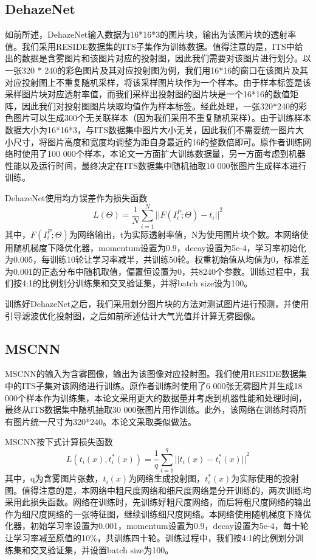 \documentclass[a4paper, 12pt]{report}
\begin{document}
\subsection{DehazeNet\quad}
如前所述，DehazeNet输入数据为16*16*3的图片块，输出为该图片块的透射率值。我们采用RESIDE数据集的ITS子集作为训练数据。值得注意的是，ITS中给出的数据是含雾图片和该图片对应的投射图，因此我们需要对该图片进行划分。以一张320 * 240的彩色图片及其对应投射图为例，我们用16*16的窗口在该图片及其对应投射图上不重复随机采样，将该采样图片块作为一个样本。由于样本标签是该采样图片块对应透射率值，而我们采样出投射图的图片块是一个16*16的数值矩阵，因此我们对投射图图片块取均值作为样本标签。经此处理，一张320*240的彩色图片可以生成300个无关联样本（因为我们采用不重复随机采样）。由于训练样本数据大小为16*16*3，与ITS数据集中图片大小无关，因此我们不需要统一图片大小尺寸，将图片高度和宽度均调整为距自身最近的16的整数倍即可。原作者训练网络时使用了100 000个样本，本论文一方面扩大训练数据量，另一方面考虑到机器性能以及运行时间，最终决定在ITS数据集中随机抽取10 000张图片生成样本进行训练。
	
DehazeNet使用均方误差作为损失函数
\begin{equation}
L(\Theta) = \frac{1}{N}\sum_{i = 1}^N {||F(I_i^P; \Theta) - t_i||}^2
\end{equation}
其中，$F(I_i^P; \Theta)$为网络输出，t为实际透射率值，N为使用图片块个数。本网络使用随机梯度下降优化器，momentum设置为0.9，decay设置为5e-4，学习率初始化为0.005，每训练10轮让学习率减半，共训练50轮。权重初始值从均值为0，标准差为0.001的正态分布中随机取值，偏置恒设置为0，共8240个参数。训练过程中，我们按4:1的比例划分训练集和交叉验证集，并将batch size设为100。

训练好DehazeNet之后，我们采用划分图片块的方法对测试图片进行预测，并使用引导滤波优化投射图，之后如前所述估计大气光值并计算无雾图像。

\subsection{MSCNN\quad}
MSCNN的输入为含雾图像，输出为该图像对应投射图。我们使用RESIDE数据集中的ITS子集对该网络进行训练。原作者训练时使用了6 000张无雾图片并生成18 000个样本作为训练集，本论文采用更大的数据量并考虑到机器性能和处理时间，最终从ITS数据集中随机抽取30 000张图片用作训练。此外，该网络在训练时将所有图片统一尺寸为320*240。本论文采取类似做法。

MSCNN按下式计算损失函数
\begin{equation}
L(t_i(x), t_i^{\ast}(x)) = \frac{1}{q}\sum_{i = 1}^q {||t_i(x) - t_i^{\ast}(x)||}^2
\end{equation}
其中，q为含雾图片张数，$t_i(x)$为网络生成投射图，$t_i^{\ast}(x)$为实际使用的投射图。值得注意的是，本网络中粗尺度网络和细尺度网络是分开训练的，两次训练均采用此损失函数。网络在训练时，先训练好粗尺度网络，而后将粗尺度网络的输出作为细尺度网络的一张特征图，继续训练细尺度网络。本网络使用随机梯度下降优化器，初始学习率设置为0.001，momentum设置为0.9，decay设置为5e-4，每十轮让学习率减至原值的10\%，共训练四十轮。训练过程中，我们按4:1的比例划分训练集和交叉验证集，并设置batch size为100。
\end{document}
